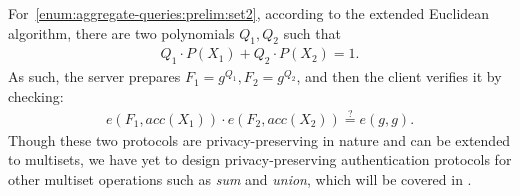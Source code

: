For~\ref{enum:aggregate-queries:prelim:set2}, according to the extended Euclidean algorithm, there are two polynomials $Q_1, Q_2$ such that
\begin{align*}
  Q_1 \cdot P(X_1) + Q_2 \cdot P(X_2) = 1.
\end{align*}
As such, the server prepares $F_1 = g^{Q_1}, F_2 = g^{Q_2}$, and then the client verifies it by checking:
\begin{align*}
  e(F_1, acc(X_1)) \cdot e(F_2, acc(X_2)) \stackrel{?}{=} e(g,g).
\end{align*}
Though these two protocols are privacy-preserving in nature and can be extended to multisets, we have yet to design privacy-preserving authentication protocols for other multiset operations such as \emph{sum} and \emph{union}, which will be covered in .
